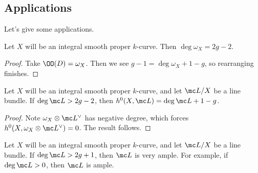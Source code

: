 \documentclass[../notes.tex]{subfiles}
\begin{document}
\subsection{Applications}
Let's give some applications.
\begin{corollary}
	Let $X$ will be an integral smooth proper $k$-curve. Then $\deg\omega_X=2g-2$.
\end{corollary}
\begin{proof}
	Take $\OO(D)=\omega_X$. Then we see $g-1=\deg\omega_X+1-g$, so rearranging finishes.
\end{proof}
\begin{corollary}
	Let $X$ will be an integral smooth proper $k$-curve, and let $\mc L/X$ be a line bundle. If $\deg\mc L>2g-2$, then $h^0(X,\mc L)=\deg\mc L+1-g$.
\end{corollary}
\begin{proof}
	Note $\omega_X\otimes\mc L^\lor$ has negative degree, which forces $h^0(X,\omega_X\otimes\mc L^\lor)=0$. The result follows.
\end{proof}
\begin{corollary}
	Let $X$ will be an integral smooth proper $k$-curve, and let $\mc L/X$ be a line bundle. If $\deg\mc L>2g+1$, then $\mc L$ is very ample. For example, if $\deg\mc L>0$, then $\mc L$ is ample.
\end{corollary}
\end{document}
